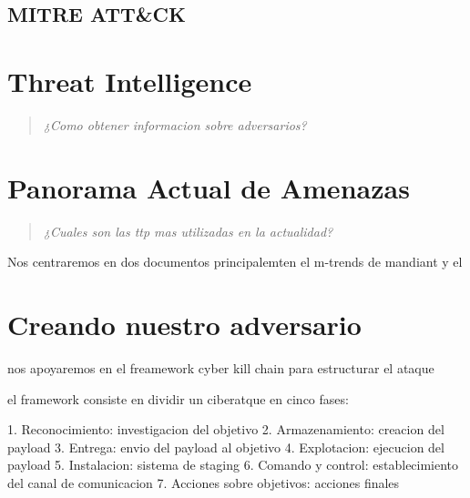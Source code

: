 \section{MITRE ATT\&CK}



\chapter{Threat Intelligence}

\begin{quote}
\textit{¿Como obtener informacion sobre adversarios?}
\end{quote}



\chapter{Panorama Actual de Amenazas}

\begin{quote}
\textit{¿Cuales son las ttp mas utilizadas en la actualidad?}
\end{quote}

Nos centraremos en dos documentos principalemten el m-trends de mandiant
y el 


\chapter{Creando nuestro adversario}

nos apoyaremos en el freamework cyber kill chain para estructurar el ataque

el framework consiste en dividir un ciberatque en cinco fases:

1. Reconocimiento: investigacion del objetivo
2. Armazenamiento: creacion del payload
3. Entrega: envio del payload al objetivo
4. Explotacion: ejecucion del payload
5. Instalacion: sistema de staging
6. Comando y control: establecimiento del canal de comunicacion
7. Acciones sobre objetivos: acciones finales

